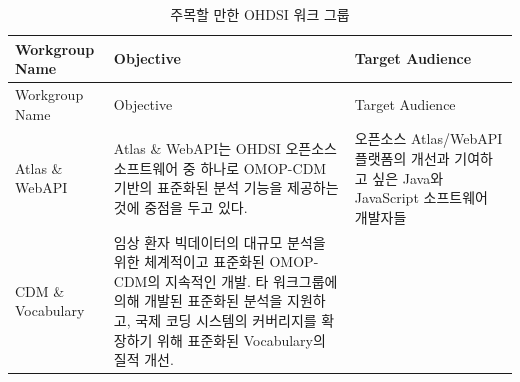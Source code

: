\documentclass[11pt]{book}
\theoremstyle{definition}
\theoremstyle{definition}
\theoremstyle{definition}
\theoremstyle{remark}
\begin{document}
\begin{longtable}[]{@{}lll@{}}
\caption{\label{tab:OHDSIworkgroups} 주목할 만한 OHDSI 워크
그룹}\tabularnewline
\toprule
\begin{minipage}[b]{0.11\columnwidth}\raggedright\strut
Workgroup Name\strut
\end{minipage} & \begin{minipage}[b]{0.44\columnwidth}\raggedright\strut
Objective\strut
\end{minipage} & \begin{minipage}[b]{0.37\columnwidth}\raggedright\strut
Target Audience\strut
\end{minipage}\tabularnewline
\midrule
\endfirsthead
\toprule
\begin{minipage}[b]{0.11\columnwidth}\raggedright\strut
Workgroup Name\strut
\end{minipage} & \begin{minipage}[b]{0.44\columnwidth}\raggedright\strut
Objective\strut
\end{minipage} & \begin{minipage}[b]{0.37\columnwidth}\raggedright\strut
Target Audience\strut
\end{minipage}\tabularnewline
\midrule
\endhead
\begin{minipage}[t]{0.11\columnwidth}\raggedright\strut
Atlas \& WebAPI\strut
\end{minipage} & \begin{minipage}[t]{0.44\columnwidth}\raggedright\strut
Atlas \& WebAPI는 OHDSI 오픈소스 소프트웨어 중 하나로 OMOP-CDM 기반의
표준화된 분석 기능을 제공하는 것에 중점을 두고 있다.\strut
\end{minipage} & \begin{minipage}[t]{0.37\columnwidth}\raggedright\strut
오픈소스 Atlas/WebAPI 플랫폼의 개선과 기여하고 싶은 Java와 JavaScript
소프트웨어 개발자들\strut
\end{minipage}\tabularnewline
\begin{minipage}[t]{0.11\columnwidth}\raggedright\strut
CDM \& Vocabulary\strut
\end{minipage} & \begin{minipage}[t]{0.44\columnwidth}\raggedright\strut
임상 환자 빅데이터의 대규모 분석을 위한 체계적이고 표준화된 OMOP-CDM의
지속적인 개발. 타 워크그룹에 의해 개발된 표준화된 분석을 지원하고, 국제
코딩 시스템의 커버리지를 확장하기 위해 표준화된 Vocabulary의 질적
개선.\strut
\end{minipage} & \begin{minipage}[t]{0.37\columnwidth}\raggedright\strut

\end{minipage}
\end{longtable}
\end{document}
